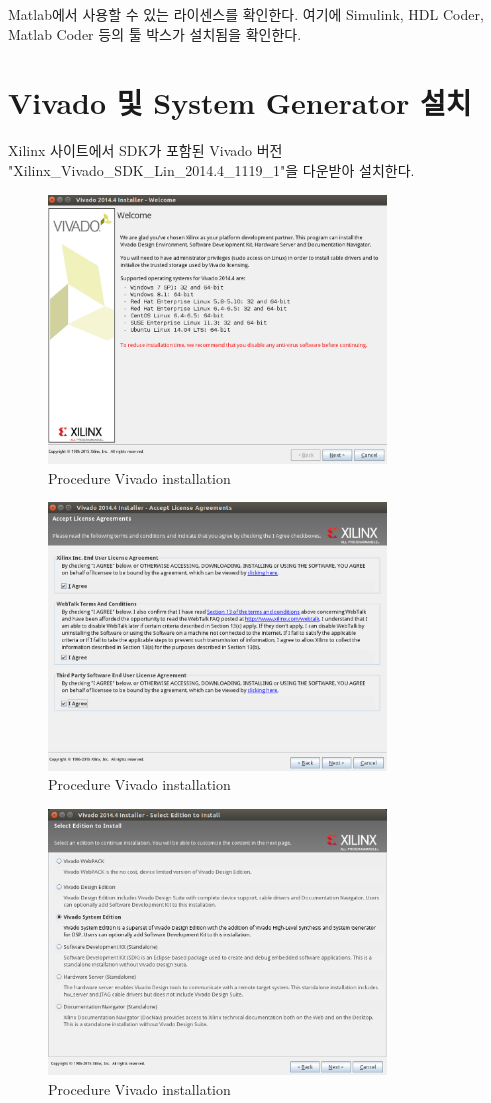 \documentclass[11pt
  , a4paper
  , article
  , oneside
]{memoir}
\begin{document}
Matlab에서 사용할 수 있는 라이센스를 확인한다.  여기에 Simulink, HDL Coder, Matlab Coder 등의 툴 박스가 설치됨을 확인한다.

\clearpage

\chapter{Vivado 및 System Generator 설치}
Xilinx 사이트에서 SDK가 포함된 Vivado 버전 "Xilinx\_Vivado\_SDK\_Lin\_2014.4\_1119\_1"을 다운받아 설치한다.

\begin{figure}[h!]
	\centering
	\includegraphics[width=0.8\textwidth, height=0.4\textwidth]{./images/vivado-1.eps}
	\caption{Procedure Vivado installation}
	\label{fig:viva_install_1} 
\end{figure}	

\begin{figure}[h!]
	\centering
	\includegraphics[width=0.8\textwidth, height=0.4\textwidth]{./images/vivado-2.eps}
	\caption{Procedure Vivado installation}
	\label{fig:viva_install_2} 
\end{figure}	


\begin{figure}[h!]
	\centering
	\includegraphics[width=0.8\textwidth, height=0.4\textwidth]{./images/vivado-3.eps}
	\caption{Procedure Vivado installation}
	\label{fig:viva_install_3} 
\end{figure}	
\end{document}
